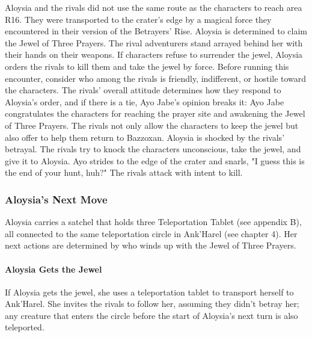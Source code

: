 \documentclass[10pt,a4,twoside,twocolumn,openany,nodeprecatedcode]{dndbook}
\begin{document}
Aloysia and the rivals did not use the same route as the characters to reach area R16. They were transported to the crater's edge by a magical force they encountered in their version of the Betrayers' Rise.
Aloysia is determined to claim the Jewel of Three Prayers. The rival adventurers stand arrayed behind her with their hands on their weapons.
If characters refuse to surrender the jewel, Aloysia orders the rivals to kill them and take the jewel by force.
Before running this encounter, consider who among the rivals is friendly, indifferent, or hostile toward the characters. The rivals' overall attitude determines how they respond to Aloysia's order, and if there is a tie, Ayo Jabe's opinion breaks it:
{{Ayo Jabe congratulates the characters for reaching the prayer site and awakening the Jewel of Three Prayers. The rivals not only allow the characters to keep the jewel but also offer to help them return to Bazzoxan. Aloysia is shocked by the rivals' betrayal.}}
{{The rivals try to knock the characters unconscious, take the jewel, and give it to Aloysia.}}
{{Ayo strides to the edge of the crater and snarls, "I guess this is the end of your hunt, huh?" The rivals attack with intent to kill.}}
\subsubsection{Aloysia's Next Move}
Aloysia carries a satchel that holds three Teleportation Tablet (see appendix B), all connected to the same teleportation circle in Ank'Harel (see chapter 4). Her next actions are determined by who winds up with the Jewel of Three Prayers.
\paragraph{Aloysia Gets the Jewel}
If Aloysia gets the jewel, she uses a teleportation tablet to transport herself to Ank'Harel. She invites the rivals to follow her, assuming they didn't betray her; any creature that enters the circle before the start of Aloysia's next turn is also teleported.
\end{document}
